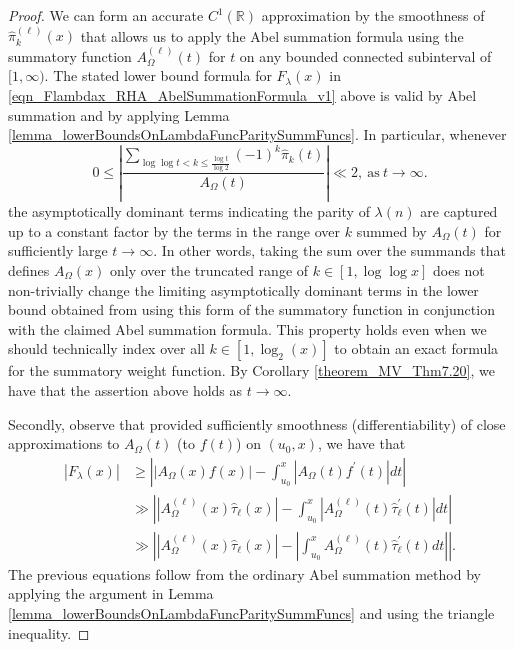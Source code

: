 \documentclass[11pt,reqno,a4letter]{article}
\numberwithin{figure}{section}
\numberwithin{table}{section}
\theoremstyle{plain}
\numberwithin{theorem}{section}
\theoremstyle{definition}
\begin{document}
\begin{proof} 
We can form an accurate $C^{1}(\mathbb{R})$ approximation by the smoothness of 
$\widehat{\pi}_k^{(\ell)}(x)$ that allows us to apply the Abel summation formula using the summatory 
function $A_{\Omega}^{(\ell)}(t)$ for $t$ on any bounded connected subinterval of $[1, \infty)$. 
The stated lower bound formula for $F_{\lambda}(x)$ in 
\eqref{eqn_Flambdax_RHA_AbelSummationFormula_v1} 
above is valid by Abel summation and by 
applying Lemma \ref{lemma_lowerBoundsOnLambdaFuncParitySummFuncs}. 
In particular, whenever 
\[
0 \leq \left\lvert \frac{\displaystyle\sum\limits_{\log\log t < k \leq \frac{\log t}{\log 2}} 
     (-1)^k \widehat{\pi}_k(t)}{A_{\Omega}(t)}\right\rvert \ll 2, 
     \mathrm{\ as\ } t \rightarrow \infty. 
\]
the asymptotically dominant terms indicating the parity of 
$\lambda(n)$ are captured up to a constant factor 
by the terms in the range over $k$ summed by $A_{\Omega}(t)$ for 
sufficiently large $t \rightarrow \infty$. 
In other words, taking the sum over the summands that defines $A_{\Omega}(x)$ only over the truncated range of 
$k \in [1, \log\log x]$ does not non-trivially change the limiting asymptotically 
dominant terms in the lower bound obtained from using this form of the summatory function in 
conjunction with the claimed Abel summation formula. 
This property holds even when we should technically 
index over all $k \in [1, \log_2(x)]$ to obtain an exact formula for the summatory weight function.  
By Corollary \ref{theorem_MV_Thm7.20}, we have that 
the assertion above holds as $t \rightarrow \infty$. 

Secondly, observe that provided sufficiently smoothness (differentiability) of 
close approximations to $A_{\Omega}(t)$ (to $f(t)$) on $(u_0, x)$, we have that 
\begin{align*} 
|F_{\lambda}(x)| & \geq \left\lvert |A_{\Omega}(x) f(x)| - \int_{u_0}^{x} 
     |A_{\Omega}(t) f^{\prime}(t)| dt \right\rvert \\ 
     & \gg \left\lvert \left\lvert A_{\Omega}^{(\ell)} (x) \widehat{\tau}_{\ell}(x) \right\rvert - 
     \int_{u_0}^{x} 
     \left\lvert A_{\Omega}^{(\ell)}(t) \widehat{\tau}_{\ell}^{\prime}(t) 
     \right\rvert dt \right\rvert \\ 
     & \gg \left\lvert \left\lvert A_{\Omega}^{(\ell)} (x) \widehat{\tau}_{\ell}(x) \right\rvert - 
     \left\lvert \int_{u_0}^{x} 
     A_{\Omega}^{(\ell)}(t) \widehat{\tau}_{\ell}^{\prime}(t) dt \right\rvert \right\rvert. 
\end{align*} 
The previous equations follow from the ordinary Abel summation method by 
applying the argument in 
Lemma \ref{lemma_lowerBoundsOnLambdaFuncParitySummFuncs} and using the triangle inequality. 
\end{proof} 
\end{document}
